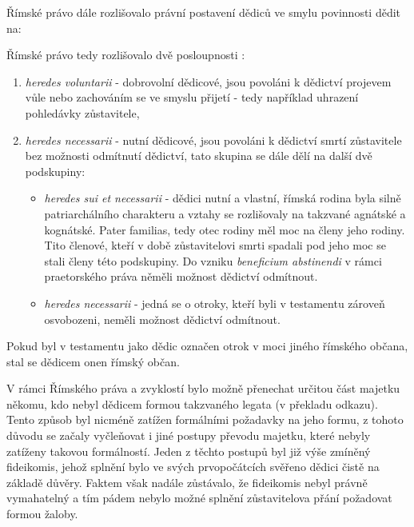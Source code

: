 \documentclass{article}
\begin{document}
\newpage

Římské právo dále rozlišovalo právní postavení dědiců ve smylu povinnosti dědit na:

\vspace{5 mm}

Římské právo tedy rozlišovalo dvě posloupnosti :
\begin{enumerate}
\item \textit{heredes voluntarii} - dobrovolní dědicové, jsou povoláni k dědictví projevem vůle nebo zachováním se ve smyslu přijetí - tedy například uhrazení pohledávky zůstavitele,
\item \textit{heredes necessarii} - nutní dědicové, jsou povoláni k dědictví smrtí zůstavitele bez možnosti odmítnutí dědictví, tato skupina se dále dělí na další dvě podskupiny:
\begin{itemize}
\item \textit{heredes sui et necessarii} - dědici nutní a vlastní, římská rodina byla silně patriarchálního charakteru a vztahy se rozlišovaly na takzvané agnátské a kognátské. Pater familias, tedy otec rodiny měl moc na členy jeho rodiny. Tito členové, kteří v době zůstavitelovi smrti spadali pod jeho moc se stali členy této podskupiny. Do vzniku \textit{beneficium abstinendi} v rámci praetorského práva něměli možnost dědictví odmítnout.
\item \textit{heredes necessarii} - jedná se o otroky, kteří byli v testamentu zároveň osvobozeni, neměli možnost dědictví odmítnout.
\end{itemize}
\end{enumerate}

\vspace{5 mm}

Pokud byl v testamentu jako dědic označen otrok v moci jiného římského občana, stal se dědicem onen římský občan. 

\newpage

V rámci Římského práva a zvyklostí bylo možně přenechat určitou část majetku někomu, kdo nebyl dědicem formou takzvaného legata (v překladu odkazu). Tento způsob byl nicméně zatížen formálními požadavky na jeho formu, z tohoto důvodu se začaly vyčleňovat i jiné postupy převodu majetku, které nebyly zatíženy takovou formálností. Jeden z těchto postupů byl již výše zmíněný fideikomis, jehož splnění bylo ve svých prvopočátcích svěřeno dědici čistě na základě důvěry. Faktem však nadále zůstávalo, že fideikomis nebyl právně vymahatelný a tím pádem nebylo možné splnění zůstavitelova přání požadovat formou žaloby.
\end{document}
